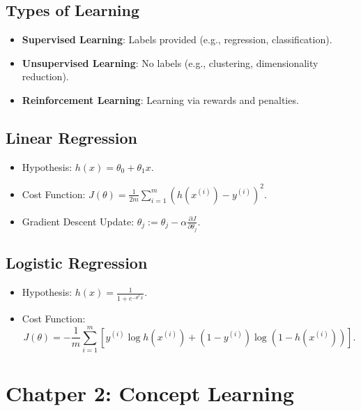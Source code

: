 \documentclass[10pt,a4paper]{article}
\begin{document}
\subsection*{Types of Learning}
\begin{itemize}
	\item \textbf{Supervised Learning}: Labels provided (e.g., regression, classification).
	\item \textbf{Unsupervised Learning}: No labels (e.g., clustering, dimensionality reduction).
	\item \textbf{Reinforcement Learning}: Learning via rewards and penalties.
\end{itemize}

\subsection*{Linear Regression}
\begin{itemize}
    \item Hypothesis: \( h(x) = \theta_0 + \theta_1 x \).
    \item Cost Function: \( J(\theta) = \frac{1}{2m} \sum_{i=1}^{m} (h(x^{(i)}) - y^{(i)})^2 \).
    \item Gradient Descent Update: \( \theta_j := \theta_j - \alpha \frac{\partial J}{\partial \theta_j} \).
\end{itemize}

\subsection*{Logistic Regression}
\begin{itemize}
    \item Hypothesis: \( h(x) = \frac{1}{1 + e^{-\theta^T x}} \).
    \item Cost Function:
    \[
    J(\theta) = -\frac{1}{m} \sum_{i=1}^{m} [y^{(i)} \log h(x^{(i)}) + (1 - y^{(i)}) \log(1 - h(x^{(i)}))].
    \]
\end{itemize}
\section*{Chatper 2: Concept Learning}
\end{document}
